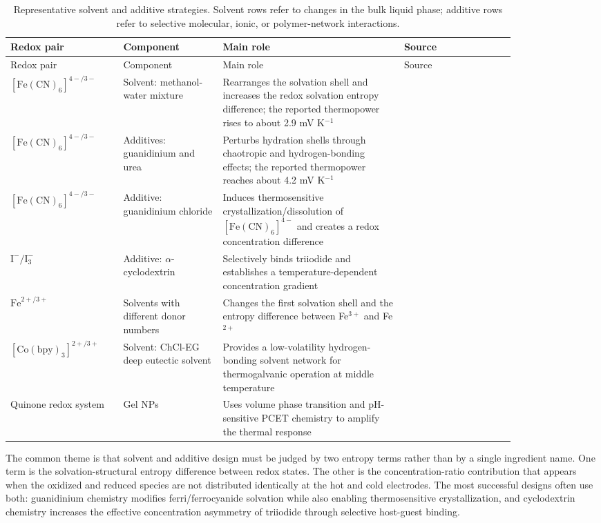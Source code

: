 \begin{longtable}{>{\raggedright\arraybackslash}p{0.18\linewidth}
>{\raggedright\arraybackslash}p{0.17\linewidth}
>{\raggedright\arraybackslash}p{0.31\linewidth}
>{\raggedright\arraybackslash}p{0.19\linewidth}}
\caption{Representative solvent and additive strategies. Solvent rows refer to
changes in the bulk liquid phase; additive rows refer to selective molecular,
ionic, or polymer-network interactions.}\\
\toprule
Redox pair & Component & Main role & Source \\
\midrule
\endfirsthead
\toprule
Redox pair & Component & Main role & Source \\
\midrule
\endhead
$[\mathrm{Fe(CN)}_6]^{4-/3-}$ & Solvent: methanol-water mixture & Rearranges the
solvation shell and increases the redox solvation entropy difference; the
reported thermopower rises to about 2.9 mV K$^{-1}$ & \citep{kim2017high} \\
$[\mathrm{Fe(CN)}_6]^{4-/3-}$ & Additives: guanidinium and urea & Perturbs hydration
shells through chaotropic and hydrogen-bonding effects; the reported
thermopower reaches about 4.2 mV K$^{-1}$ & \citep{duan2018aqueous} \\
$[\mathrm{Fe(CN)}_6]^{4-/3-}$ & Additive: guanidinium chloride & Induces
thermosensitive crystallization/dissolution of $[\mathrm{Fe(CN)}_6]^{4-}$ and
creates a redox concentration difference & \citep{yu2020thermosensitive} \\
$\mathrm{I}^{-}/\mathrm{I}_3^{-}$ & Additive: $\alpha$-cyclodextrin & Selectively binds
triiodide and establishes a temperature-dependent concentration gradient &
\citep{zhou2016supramolecular} \\
$\mathrm{Fe}^{2+/3+}$ & Solvents with different donor numbers &
Changes the first solvation shell and the entropy difference between
Fe$^{3+}$ and Fe$^{2+}$ & \citep{chen2023solvation} \\
$[\mathrm{Co(bpy)}_3]^{2+/3+}$ & Solvent: ChCl-EG deep eutectic solvent & Provides a
low-volatility hydrogen-bonding solvent network
for thermogalvanic operation at middle temperature & \citep{antariksa2021deep} \\
Quinone redox system & Gel NPs & Uses volume
phase transition and pH-sensitive PCET chemistry to amplify the thermal
response & \citep{guo2020nanoparticle} \\
\bottomrule
\end{longtable}

The common theme is that solvent and additive design must be judged by two
entropy terms rather than by a single ingredient name. One term is the
solvation-structural entropy difference between redox states. The other is the
concentration-ratio contribution that appears when the oxidized and reduced
species are not distributed identically at the hot and cold electrodes. The
most successful designs often use both: guanidinium chemistry modifies
ferri/ferrocyanide solvation while also enabling thermosensitive
crystallization, and cyclodextrin chemistry increases the effective
concentration asymmetry of triiodide through selective host-guest binding.

